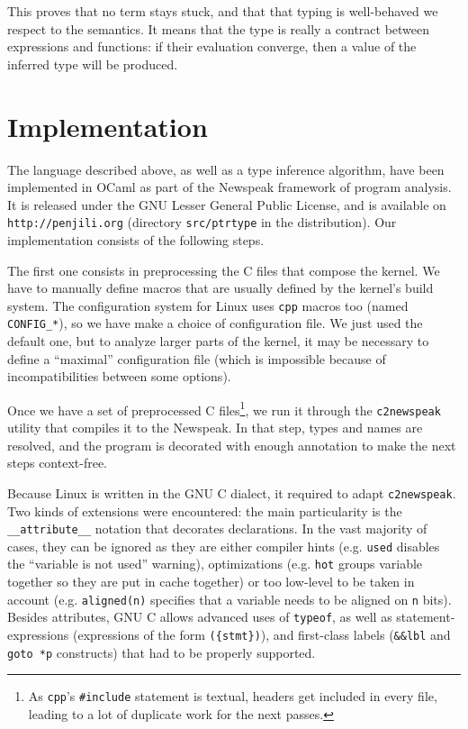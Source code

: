 This proves that no term stays stuck, and that that typing is well-behaved we
respect to the semantics. It means that the type is really a contract between
expressions and functions: if their evaluation converge, then a value of the
inferred type will be produced.

\section{Implementation}
\label{sec:implem}

The language described above, as well as a type inference algorithm, have been
implemented in OCaml as part of the Newspeak framework of program
analysis\cite{newspeak}. It is released under the GNU Lesser General Public
License, and is available on \texttt{http://penjili.org} (directory
\texttt{src/ptrtype} in the distribution). Our implementation consists of the
following steps.

The first one consists in preprocessing the C files that compose the kernel. We
have to manually define macros that are usually defined by the kernel's build
system. The configuration system for Linux uses \texttt{cpp} macros too (named
\texttt{CONFIG\_*}), so we have make a choice of configuration file. We just
used the default one, but to analyze larger parts of the kernel, it may be
necessary to define a ``maximal'' configuration file (which is impossible
because of incompatibilities between some options).

Once we have a set of preprocessed C files\footnote{
  As \texttt{cpp}'s \texttt{\#include} statement is textual, headers get
  included in every file, leading to a lot of duplicate work for the next
  passes.
},
we run it through the \texttt{c2newspeak} utility that compiles it to the
Newspeak. In that step, types and
names are resolved, and the program is decorated with enough annotation to make
the next steps context-free.

Because Linux is written in the GNU C dialect, it required to adapt
\texttt{c2newspeak}. Two kinds of extensions were encountered: the main
particularity is the \texttt{\_\_attribute\_\_} notation that
decorates declarations. In the vast majority of cases, they can be ignored as
they are either compiler hints (e.g. \texttt{used} disables the ``variable is
not used'' warning), optimizations (e.g. \texttt{hot} groups variable together
so they are put in cache together) or too low-level to be taken in account (e.g.
\texttt{aligned(n)} specifies that a variable needs to be aligned on \texttt{n}
bits). Besides attributes, GNU C allows advanced uses of \texttt{typeof}, as
well as statement-expressions (expressions of the form \texttt{(\{stmt\})}), and
first-class labels (\texttt{\&\&lbl} and \texttt{goto *p} constructs) that had
to be properly supported.

